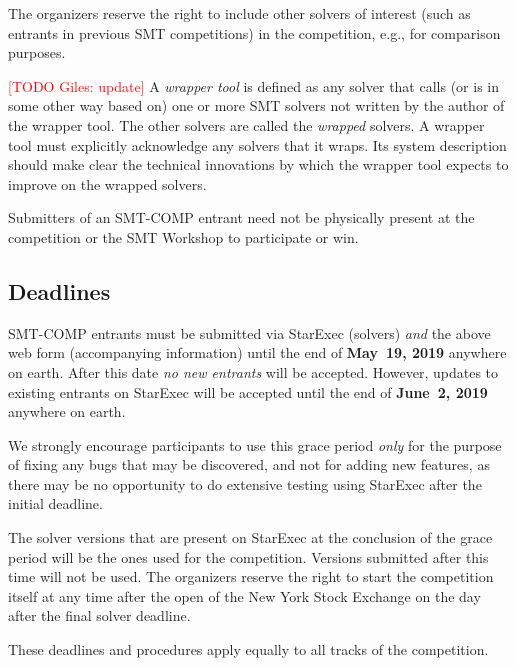 \documentclass[12pt]{article}
\newcommand{\rem}[1]{\textcolor{red}{[#1]}}
\newcommand{\todo}[1]{\rem{TODO #1}}
\begin{document}
%
The organizers reserve the right to include other solvers of interest
(such as entrants in previous SMT competitions) in the competition,
e.g., for comparison purposes.

%
\todo{Giles: update}
A \emph{wrapper tool} is defined as any solver that calls (or is in
some other way based on) one or more SMT solvers not written by the
author of the wrapper tool.  The other solvers are called the
\emph{wrapped} solvers.  A wrapper tool must explicitly acknowledge
any solvers that it wraps.  Its system description should make clear
the technical innovations by which the wrapper tool expects to improve
on the wrapped solvers.

%
Submitters of an SMT-COMP entrant need not be physically present at
the competition or the SMT Workshop to participate or win.


\subsection*{Deadlines}

SMT-COMP entrants must be submitted via StarExec (solvers) \emph{and}
the above web form (accompanying information) until the end of
{\bf May~19, 2019} anywhere on earth.
After this date \emph{no new entrants} will be accepted.
However, updates to existing entrants on StarExec
will be accepted until the end of {\bf June~2, 2019} anywhere on earth.

We strongly encourage participants to use this grace period
\emph{only} for the purpose of fixing any bugs that may be discovered,
and not for adding new features, as there may be no opportunity to do
extensive testing using StarExec after the initial deadline.

The solver versions that are present on StarExec at the conclusion of
the grace period will be the ones used for the competition.  Versions
submitted after this time will not be used.  The organizers reserve
the right to start the competition itself at any time after the open
of the New York Stock Exchange on the day after the final solver
deadline.

These deadlines and procedures apply equally to all tracks of the
competition.



\end{document}
